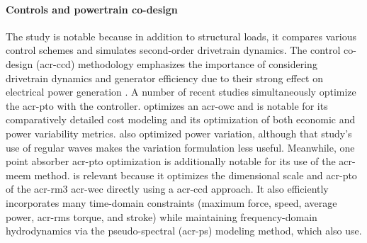     \paragraph{Controls and powertrain co-design}
    The study \citep{ferri_balancing_2014} is notable because in addition to structural loads, it compares various control schemes and simulates second-order drivetrain dynamics.
    The control co-design (\gls{acr-ccd}) methodology \citep{garcia-sanz_control_2019} emphasizes the importance of considering drivetrain dynamics and generator efficiency due to their strong effect on electrical power generation \citep{coe_useful_2023}.
    A number of recent studies \citep{rosati_control_2023,son_performance_2016,anderson_re-imagining_2024,devin_high-dimensional_2024,grasberger_control_2024} simultaneously optimize the \gls{acr-pto} with the controller.
    \citet{rosati_control_2023} optimizes an \gls{acr-owc} and is notable for its comparatively detailed cost modeling and its optimization of both economic and power variability metrics.
    \citet{mccabe_multidisciplinary_2022} also optimized power variation, although that study's use of regular waves makes the variation formulation less useful.
    Meanwhile, one point absorber \gls{acr-pto} optimization \citep{son_performance_2016} is additionally notable for its use of the \gls{acr-meem} method.
    \citet{gaebele_tpl_2025} is relevant because it optimizes the dimensional scale and \gls{acr-pto} of the \gls{acr-rm3} \gls{acr-wec} directly using a \gls{acr-ccd} approach.
    It also efficiently incorporates many time-domain constraints (maximum force, speed, average power, \gls{acr-rms} torque, and stroke) while maintaining frequency-domain hydrodynamics via the pseudo-spectral (\gls{acr-ps}) modeling method, which \citep{devin_high-dimensional_2024,grasberger_control_2024} also use.

